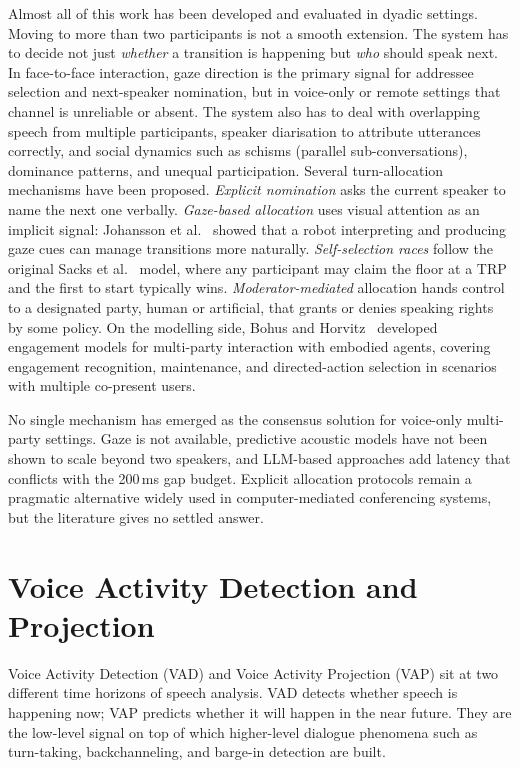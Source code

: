 Almost all of this work has been developed and evaluated in dyadic settings. Moving to more than two participants is not a smooth extension. The system has to decide not just \emph{whether} a transition is happening but \emph{who} should speak next. In face-to-face interaction, gaze direction is the primary signal for addressee selection and next-speaker nomination, but in voice-only or remote settings that channel is unreliable or absent. The system also has to deal with overlapping speech from multiple participants, speaker diarisation to attribute utterances correctly, and social dynamics such as schisms (parallel sub-conversations), dominance patterns, and unequal participation. Several turn-allocation mechanisms have been proposed. \emph{Explicit nomination} asks the current speaker to name the next one verbally. \emph{Gaze-based allocation} uses visual attention as an implicit signal: Johansson et al.~\cite{johansson2013gaze} showed that a robot interpreting and producing gaze cues can manage transitions more naturally. \emph{Self-selection races} follow the original Sacks et al.~\cite{sacks1974turntaking} model, where any participant may claim the floor at a TRP and the first to start typically wins. \emph{Moderator-mediated} allocation hands control to a designated party, human or artificial, that grants or denies speaking rights by some policy. On the modelling side, Bohus and Horvitz~\cite{bohus2009engagement,bohus2011multiparty} developed engagement models for multi-party interaction with embodied agents, covering engagement recognition, maintenance, and directed-action selection in scenarios with multiple co-present users.

No single mechanism has emerged as the consensus solution for voice-only multi-party settings. Gaze is not available, predictive acoustic models have not been shown to scale beyond two speakers, and LLM-based approaches add latency that conflicts with the 200\,ms gap budget. Explicit allocation protocols remain a pragmatic alternative widely used in computer-mediated conferencing systems, but the literature gives no settled answer.

\section{Voice Activity Detection and Projection}
\label{sec:vad-vap}

Voice Activity Detection (VAD) and Voice Activity Projection (VAP) sit at two different time horizons of speech analysis. VAD detects whether speech is happening now; VAP predicts whether it will happen in the near future. They are the low-level signal on top of which higher-level dialogue phenomena such as turn-taking, backchanneling, and barge-in detection are built.

